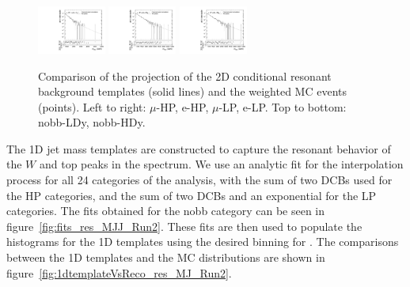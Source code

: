 \begin{figure}[htbp]
  \includegraphics[width=0.2\textwidth]{fig/2Dfit/templateVsReco_res_r0_MVV_e_HP_nobb_HDy.pdf}
  \includegraphics[width=0.2\textwidth]{fig/2Dfit/templateVsReco_res_r0_MVV_mu_LP_nobb_HDy.pdf}
  \includegraphics[width=0.2\textwidth]{fig/2Dfit/templateVsReco_res_r0_MVV_e_LP_nobb_HDy.pdf}\\
  \caption{
    Comparison of the \MVV projection of the 2D conditional resonant background templates (solid lines) and the weighted MC events (points).
    Left to right: $\mu$-HP, e-HP, $\mu$-LP, e-LP.
    Top to bottom: nobb-LDy, nobb-HDy.
  }
  \label{fig:condTemplateVscondReco_res_MVV_Run2}
\end{figure}

The 1D jet mass templates are constructed to capture the resonant behavior of the $W$ and top peaks in the \MJ spectrum.
We use an analytic fit for the interpolation process for all 24 categories of the analysis, with the sum of two DCBs used for the HP categories, and the sum of two DCBs and an exponential for the LP categories.
The fits obtained for the nobb category can be seen in figure~\ref{fig:fits_res_MJJ_Run2}.
These fits are then used to populate the histograms for the 1D templates using the desired binning for \MJ.
The comparisons between the 1D templates and the MC distributions are shown in figure~\ref{fig:1dtemplateVsReco_res_MJ_Run2}.

